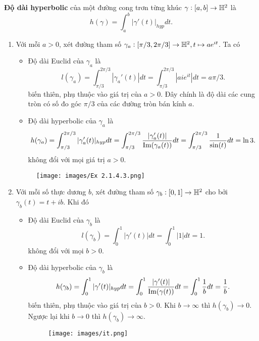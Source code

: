 \begin{defn}
    \textbf{Độ dài hyperbolic} của một đường cong trơn từng khúc $\gamma: [a,b]\to \mathbb{H}^2$ là
    \[h(\gamma) = \int_a^b|\gamma'(t)|_{hyp}dt.\]
\end{defn}
\begin{exam*}
\begin{enumerate}
    \item Với mỗi $a>0$, xét đường tham số $\gamma_a: [\pi/3, 2\pi/3]\to \mathbb{H}^2, t \mapsto ae^{it}$. Ta có
    \begin{itemize}
            \item Độ dài Euclid của $\gamma_a$ là
            \[l(\gamma_a) = \int_{\pi/3}^{2\pi/3}{|\gamma_a'(t)|dt} = \int_{\pi/3}^{2\pi/3}|aie^{it}|dt = a\pi/3.\]
            biến thiên, phụ thuộc vào giá trị của $a>0$. Đây chính là độ dài các cung tròn có số đo góc $\pi/3$ của các đường tròn bán kính $a$.
            \item Độ dài hyperbolic của $\gamma_a$ là
            \[h(\gamma_a) = \int_{\pi/3}^{2\pi/3}|\gamma_a'(t)|_{hyp}dt = \int_{\pi/3}^{2\pi/3}\dfrac{|\gamma_a'(t)|}{\operatorname{Im}(\gamma_a(t))}dt = \int_{\pi/3}^{2\pi/3}{\dfrac{1}{\sin(t)}}dt = \ln{3}.\]
            không đổi với mọi giá trị $a>0$.
        \end{itemize}
        \begin{figure}[htp!]
            \centering
            \texttt{[image: images/Ex 2.1.4.3.png]}
        \end{figure}


    \item Với mỗi số thực dương $b$, xét đường tham số $\gamma_b:[0,1]\to \mathbb{H}^2$ cho bởi $\gamma_b(t) = t+ib$. Khi đó 
        \begin{itemize}
            \item Độ dài Euclid của $\gamma_b$ là
            \[l(\gamma_b) = \int_0^1{|\gamma'(t)|dt} = \int_0^1|1|dt = 1.\]
            không đổi với mọi $b>0$.
            \item Độ dài hyperbolic của $\gamma_b$ là
            \[h(\gamma_b) = \int_0^1|\gamma'(t)|_{hyp}dt = \int_0^1\dfrac{|\gamma'(t)|}{\operatorname{Im}(\gamma(t))}dt = \int_0^1{\dfrac{1}{b}}dt = \dfrac{1}{b}.\]
            biến thiên, phụ thuộc vào giá trị của $b>0$. Khi $b \to \infty$ thì $h(\gamma_b) \to 0$. Ngược lại khi $b \to 0$ thì $h(\gamma_b) \to \infty$.
            \begin{figure}[htp!]
                \centering
                \texttt{[image: images/it.png]}
            \end{figure}
        \end{itemize}
    
        
\end{enumerate}
\end{exam*}

